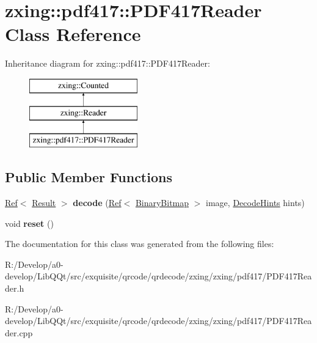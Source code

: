 \hypertarget{classzxing_1_1pdf417_1_1_p_d_f417_reader}{}\section{zxing\+:\+:pdf417\+:\+:P\+D\+F417\+Reader Class Reference}
\label{classzxing_1_1pdf417_1_1_p_d_f417_reader}
Inheritance diagram for zxing\+:\+:pdf417\+:\+:P\+D\+F417\+Reader\+:\begin{figure}[H]
\begin{center}
\leavevmode
\includegraphics[height=3.000000cm]{classzxing_1_1pdf417_1_1_p_d_f417_reader}
\end{center}
\end{figure}
\subsection*{Public Member Functions}
\begin{DoxyCompactItemize}
\item 
\mbox{\label{classzxing_1_1pdf417_1_1_p_d_f417_reader_a846452ea001a416e2003cb3141384081}} 
\mbox{\hyperlink{classzxing_1_1_ref}{Ref}}$<$ \mbox{\hyperlink{classzxing_1_1_result}{Result}} $>$ {\bfseries decode} (\mbox{\hyperlink{classzxing_1_1_ref}{Ref}}$<$ \mbox{\hyperlink{classzxing_1_1_binary_bitmap}{Binary\+Bitmap}} $>$ image, \mbox{\hyperlink{classzxing_1_1_decode_hints}{Decode\+Hints}} hints)
\item 
\mbox{\label{classzxing_1_1pdf417_1_1_p_d_f417_reader_a05d946092e922cfa5db003e1dab6b630}} 
void {\bfseries reset} ()
\end{DoxyCompactItemize}


The documentation for this class was generated from the following files\+:\begin{DoxyCompactItemize}
\item 
R\+:/\+Develop/a0-\/develop/\+Lib\+Q\+Qt/src/exquisite/qrcode/qrdecode/zxing/zxing/pdf417/P\+D\+F417\+Reader.\+h\item 
R\+:/\+Develop/a0-\/develop/\+Lib\+Q\+Qt/src/exquisite/qrcode/qrdecode/zxing/zxing/pdf417/P\+D\+F417\+Reader.\+cpp\end{DoxyCompactItemize}
